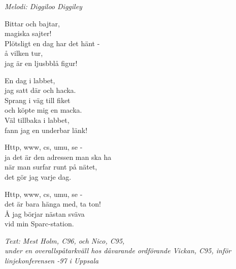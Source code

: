 {\footnotesize\textit{Melodi: Diggiloo Diggiley}}\par
\vspace{10pt}
Bittar och bajtar,\\
magiska sajter!\\
Plötsligt en dag har det hänt -\\
å vilken tur,\\
jag är en ljusbblå figur!\par
\vspace{10pt}
En dag i labbet,\\
jag satt där och hacka.\\
Sprang i väg till fiket\\
och köpte mig en macka.\\
Väl tillbaka i labbet,\\
fann jag en underbar länk!\par
\vspace{10pt}
Http, www, cs, umu, se -\\
ja det är den adressen man ska ha\\
när man surfar runt på nätet,\\
det gör jag varje dag.\par
\vspace{10pt}
Http, www, cs, umu, se -\\
det är bara hänga med, ta ton!\\
Å jag börjar nästan sväva\\
vid min Sparc-station.\par
\vspace{10pt}
{\footnotesize\textit{Text: Mest Holm, C96, och Nico, C95,\\
under en overallspåtarkväll hos dåvarande ordförande Vickan, C95, inför linjekonferensen -97 i Uppsala}}
